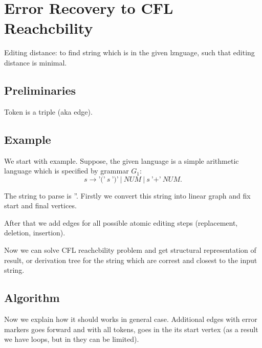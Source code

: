 \section{Error Recovery to CFL Reachcbility}

Editing distance: to find string which is in the given lznguage, such that editing distance is minimal.

\subsection{Preliminaries}

Token is a triple (aka edge).

\subsection{Example}

We start with example.
Suppose, the given language is a simple arithmetic language which is specified by grammar $G_1:$
$$
s \to \text{'('} \ s \ \text{')'} \ | \ \textit{NUM} \ | \ s \ \text{'+'} \ \textit{NUM}.
$$

The string to parse is ''.
Firstly we convert this string into linear graph and fix start and final vertices.

After that we add edges for all possible atomic editing steps (replacement, deletion, insertion).

Now we can solve CFL reachcbility problem and get structural representation of result, or derivation tree for the string which are correst and closest to the input string.

\subsection{Algorithm}

Now we explain how it should works in general case.
Additional edges with error markers goes forward and with all tokens, goes in the its start vertex
(as a result we have loops, but in they can be limited).



